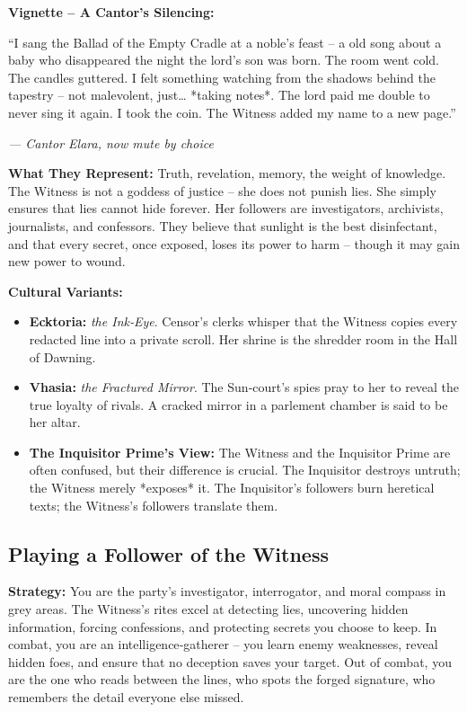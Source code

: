 \documentclass[10pt,a5paper]{book}
\begin{document}
\textbf{Vignette – A Cantor’s Silencing:}
\epigraph{“I sang the Ballad of the Empty Cradle at a noble’s feast – a old song about a baby who disappeared the night the lord’s son was born. The room went cold. The candles guttered. I felt something watching from the shadows behind the tapestry – not malevolent, just… *taking notes*. The lord paid me double to never sing it again. I took the coin. The Witness added my name to a new page.”}{\textit{— Cantor Elara, now mute by choice}}

\textbf{What They Represent:} Truth, revelation, memory, the weight of knowledge. The Witness is not a goddess of justice – she does not punish lies. She simply ensures that lies cannot hide forever. Her followers are investigators, archivists, journalists, and confessors. They believe that sunlight is the best disinfectant, and that every secret, once exposed, loses its power to harm – though it may gain new power to wound.

\textbf{Cultural Variants:}
\begin{itemize}
    \item \textbf{Ecktoria:} \textit{the Ink‑Eye}. Censor’s clerks whisper that the Witness copies every redacted line into a private scroll. Her shrine is the shredder room in the Hall of Dawning.
    \item \textbf{Vhasia:} \textit{the Fractured Mirror}. The Sun‑court’s spies pray to her to reveal the true loyalty of rivals. A cracked mirror in a parlement chamber is said to be her altar.
    \item \textbf{The Inquisitor Prime’s View:} The Witness and the Inquisitor Prime are often confused, but their difference is crucial. The Inquisitor destroys untruth; the Witness merely *exposes* it. The Inquisitor’s followers burn heretical texts; the Witness’s followers translate them.
\end{itemize}

\subsection*{Playing a Follower of the Witness}

\textbf{Strategy:} You are the party’s investigator, interrogator, and moral compass in grey areas. The Witness’s rites excel at detecting lies, uncovering hidden information, forcing confessions, and protecting secrets you choose to keep. In combat, you are an intelligence‑gatherer – you learn enemy weaknesses, reveal hidden foes, and ensure that no deception saves your target. Out of combat, you are the one who reads between the lines, who spots the forged signature, who remembers the detail everyone else missed.
\end{document}
